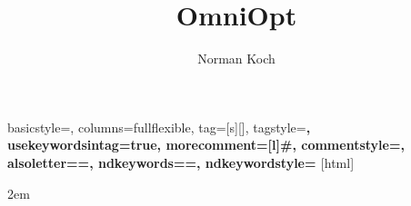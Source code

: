     \newcommand{\ctexttt}[1]{\colorbox{cverbbg}{\texttt{#1}}}
    \newverbcommand{\cverb}
      {\setbox\verbbox\hbox\bgroup}
        {\egroup\colorbox{cverbbg}{\box\verbbox}}


{
    basicstyle=\ttfamily\small,
    columns=fullflexible,
    tag=[s]{[]},
    tagstyle=\color{red}\bfseries,
    usekeywordsintag=true,
    morecomment=[l]{\#},
    commentstyle=\color{gray}\ttfamily,
    alsoletter={=},
    ndkeywords={=},
    ndkeywordstyle=\color{green}\bfseries
}[html]


\emergencystretch2em

\title{OmniOpt}

\author{Norman Koch}
